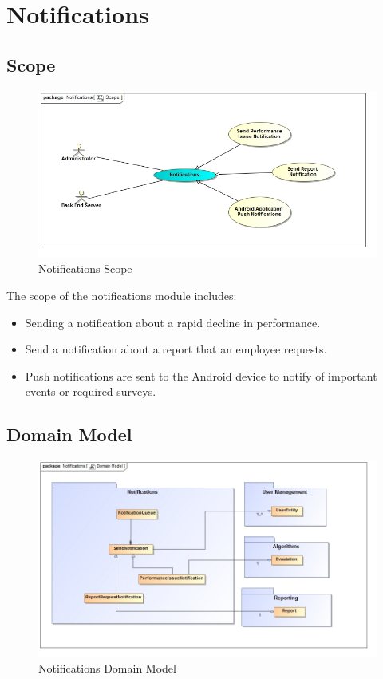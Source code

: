 \documentclass[11pt,a4paper]{article}
\begin{document}
\pagebreak

\section{Notifications}
\subsection{Scope}
\begin{figure}[H]
	\begin{center}
		\includegraphics[scale=0.6]{../Images/Notifications_Scope.jpg}
		\caption{Notifications Scope}
	\end{center}
\end{figure}
The scope of the notifications module includes:
\begin{itemize}
	\item Sending a notification about a rapid decline in performance.
	\item Send a notification about a report that an employee requests.
	\item Push notifications are sent to the Android device to notify of important events or required surveys.
\end{itemize}

\subsection{Domain Model}
\begin{figure}[H]
	\begin{center}
		\includegraphics[scale=0.55]{../Images/Notifications_Domain.jpg}
		\caption{Notifications Domain Model}
	\end{center}
\end{figure}
\end{document}
